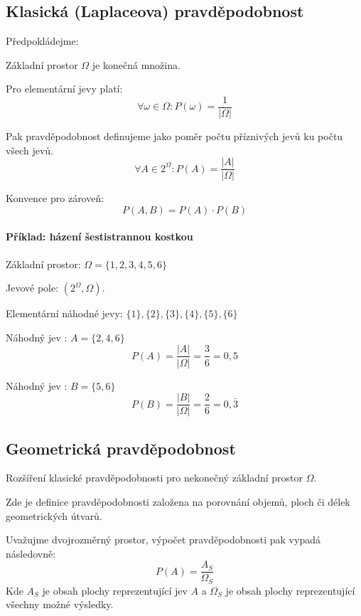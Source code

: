 \subsection{Klasická (Laplaceova) pravděpodobnost}

\begin{compactitem}
    \item Předpokládejme: \begin{compactitem}
        \item Základní prostor $\Omega$ je konečná množina.
        \item Pro elementární jevy platí:
        $$\forall \omega \in \Omega : P(\omega) = \frac{1}{|\Omega|}$$
    \end{compactitem}

    \item Pak pravděpodobnost definujeme jako poměr počtu příznivých jevů ku počtu všech jevů.
    $$ \forall A \in 2^{\Omega} : P(A) = \frac{|A|}{|\Omega|} $$

    \item Konvence pro zároveň:
    $$ P(A, B) = P(A) \cdot P(B) $$
\end{compactitem}

\paragraph*{Příklad: házení šestistrannou kostkou}

\begin{compactitem}
    \item Základní prostor: $\Omega = \{ 1, 2, 3, 4, 5, 6 \}$
    \item Jevové pole: $(2^{\Omega}, \Omega)$.
    \item Elementární náhodné jevy: $ \{1\}, \{2\}, \{3\}, \{4\}, \{5\}, \{6\} $
    \item Náhodný jev : $A = \{ 2, 4, 6 \}$
    $$ P(A) = \frac{|A|}{|\Omega|} = \frac{3}{6} = 0,5 $$
    \item Náhodný jev : $B = \{ 5, 6 \}$
    $$ P(B) = \frac{|B|}{|\Omega|} = \frac{2}{6} = 0,\bar{3} $$
\end{compactitem}

\subsection{Geometrická pravděpodobnost}

\begin{compactitem}
    \item Rozšíření klasické pravděpodobnosti pro nekonečný základní prostor $\Omega$.

    \item Zde je definice pravděpodobnosti založena na porovnání objemů, ploch či délek geometrických útvarů.

    \item Uvažujme dvojrozměrný prostor, výpočet pravděpodobnosti pak vypadá následovně:
    $$ P(A) = \frac{A_S}{\Omega_S}$$
    Kde $A_S$ je obsah plochy reprezentující jev $A$ a $\Omega_S$ je obsah plochy reprezentující všechny možné výsledky.
\end{compactitem}

